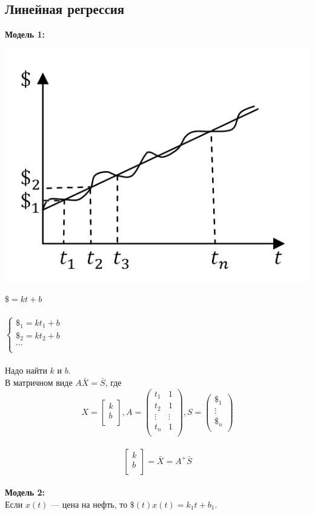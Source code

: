 \documentclass[12pt]{article}
\begin{document}
	\subsection{Линейная регрессия}
	\textbf{Модель 1:}\begin{center}
		\includegraphics[scale=0.7]{l2_2.png}\end{center}
	$\$ = kt+b$\\ \\
	$
	\left\{  
	\begin{array}{ccl}  
	\$_1=kt_1+b\\
	\$_2=kt_2+b\\
	\cdots\\
	\end{array}   
	\right.  
	$\\ \\
	Надо найти $k$ и $b$.\\
	В матричном виде $A\bar X=\bar S$, где\\
	\[X = \begin{bmatrix}
	k\\         
	b\\
	\end{bmatrix}, A = \begin{pmatrix}
	t_1 & 1\\         
	t_2 & 1\\
	\vdots & \vdots\\
	t_n & 1\\
	\end{pmatrix}, S = \begin{pmatrix}
	\$_1\\         
	\vdots\\
	\$_n\\
	\end{pmatrix}\]\\
	\[\begin{bmatrix}
	k\\         
	b\\
	\end{bmatrix} = \bar X = A^+\bar S\]\\
	\textbf{Модель 2:}\\
	Если $x(t)$ --- цена на нефть, то $\$(t)x(t)=k_1t+b_1$.\\
	\\
\end{document}
